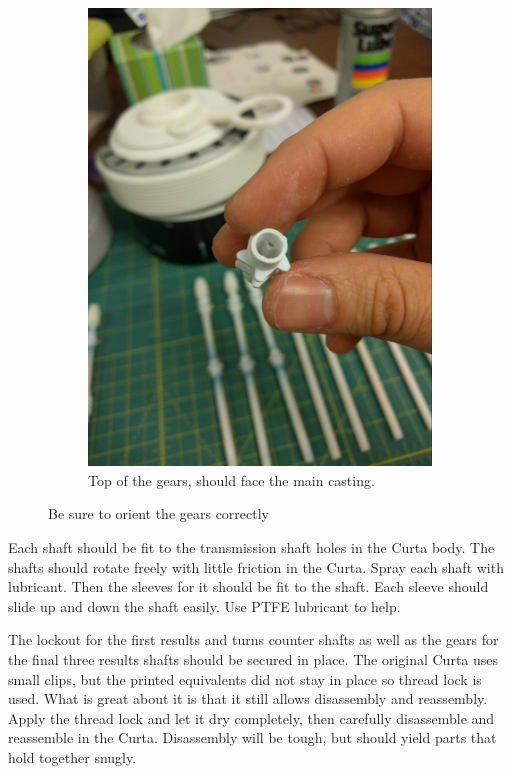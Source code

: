 \documentclass[openany]{book}
\begin{document}
\begin{figure}[!ht]
\begin{subfigure}{.46\textwidth}
		\includegraphics[width=.95\textwidth]{images/image38.jpg}
		\caption{Top of the gears, should face the main casting.}
		\label{fig:image38}	
	\end{subfigure}
 	\caption{Be sure to orient the gears correctly}
 	\label{fig:gearorient}
\end{figure}

Each shaft should be fit to the transmission shaft holes in the Curta body. The shafts should rotate freely with little friction in the Curta. Spray each shaft with lubricant. Then the sleeves for it should be fit to the shaft. Each sleeve should slide up and down the shaft easily. Use PTFE lubricant to help.

The lockout for the first results and turns counter shafts as well as the gears for the final three results shafts should be secured in place. The original Curta uses small clips, but the printed equivalents did not stay in place so thread lock is used. What is great about it is that it still allows disassembly and reassembly. Apply the thread lock and let it dry completely, then carefully disassemble and reassemble in the Curta. Disassembly will be tough, but should yield parts that hold together snugly.
\end{document}
